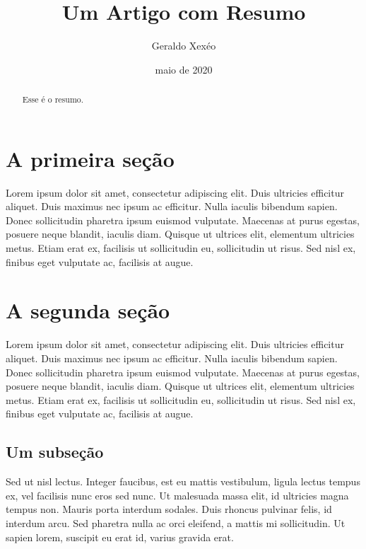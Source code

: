 \documentclass{article}
\title{Um Artigo com Resumo}
\author{Geraldo Xexéo}
\date{maio de 2020}
\begin{document}
\maketitle

\begin{abstract}
    Esse é o resumo.
\end{abstract}

\section{A primeira seção}

Lorem ipsum dolor sit amet, consectetur adipiscing elit. Duis ultricies efficitur aliquet. Duis maximus nec ipsum ac efficitur. Nulla iaculis bibendum sapien. Donec sollicitudin pharetra ipsum euismod vulputate. Maecenas at purus egestas, posuere neque blandit, iaculis diam. Quisque ut ultrices elit, elementum ultricies metus. Etiam erat ex, facilisis ut sollicitudin eu, sollicitudin ut risus. Sed nisl ex, finibus eget vulputate ac, facilisis at augue.

\section{A segunda seção}

Lorem ipsum dolor sit amet, consectetur adipiscing elit. Duis ultricies efficitur aliquet. Duis maximus nec ipsum ac efficitur. Nulla iaculis bibendum sapien. Donec sollicitudin pharetra ipsum euismod vulputate. Maecenas at purus egestas, posuere neque blandit, iaculis diam. Quisque ut ultrices elit, elementum ultricies metus. Etiam erat ex, facilisis ut sollicitudin eu, sollicitudin ut risus. Sed nisl ex, finibus eget vulputate ac, facilisis at augue.

\subsection{Um subseção}


Sed ut nisl lectus. Integer faucibus, est eu mattis vestibulum, ligula lectus tempus ex, vel facilisis nunc eros sed nunc. Ut malesuada massa elit, id ultricies magna tempus non. Mauris porta interdum sodales. Duis rhoncus pulvinar felis, id interdum arcu. Sed pharetra nulla ac orci eleifend, a mattis mi sollicitudin. Ut sapien lorem, suscipit eu erat id, varius gravida erat.
\end{document}
